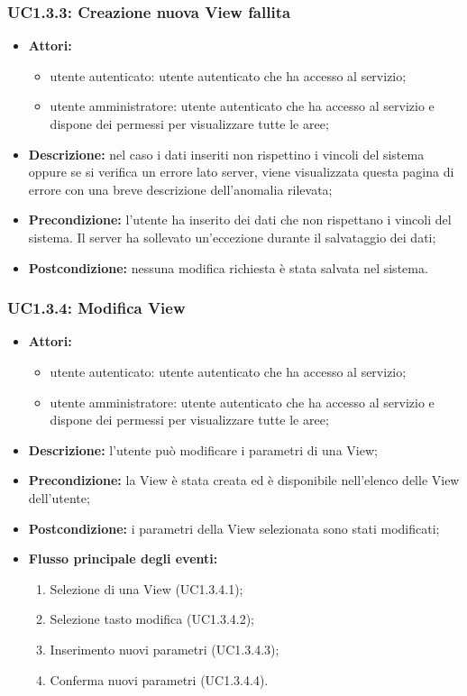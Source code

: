 \subsubsection{UC1.3.3: Creazione nuova View fallita}

\begin{itemize}
   	\item \textbf{Attori:}
    \begin{itemize}
    	\item utente autenticato: utente autenticato che ha accesso al servizio;
    	\item utente amministratore: utente autenticato che ha accesso al servizio e dispone dei permessi per visualizzare tutte le aree;
	\end{itemize}
    \item \textbf{Descrizione:} nel caso i dati inseriti non rispettino i vincoli del sistema oppure se si verifica un errore lato server, viene visualizzata questa pagina di errore con una breve descrizione dell'anomalia rilevata;
    \item \textbf{Precondizione:} l'utente ha inserito dei dati che non rispettano i vincoli del sistema. Il server ha sollevato un'eccezione durante il salvataggio dei dati;
    \item \textbf{Postcondizione:} nessuna modifica richiesta è stata salvata nel sistema.
\end{itemize}

\subsubsection{UC1.3.4: Modifica View}

\begin{itemize}
   	\item \textbf{Attori:}
    \begin{itemize}
    	\item utente autenticato: utente autenticato che ha accesso al servizio;
    	\item utente amministratore: utente autenticato che ha accesso al servizio e dispone dei permessi per visualizzare tutte le aree;
	\end{itemize}
    \item \textbf{Descrizione:} l'utente può modificare i parametri di una View;
    \item \textbf{Precondizione:} la View è stata creata ed è disponibile nell'elenco delle View dell'utente;
    \item \textbf{Postcondizione:} i parametri della View selezionata sono stati modificati;
	\item \textbf{Flusso principale degli eventi:}
    \begin{enumerate}
        \item Selezione di una View (UC1.3.4.1);
        \item Selezione tasto modifica (UC1.3.4.2);
        \item Inserimento nuovi parametri (UC1.3.4.3);
        \item Conferma nuovi parametri (UC1.3.4.4).
    \end{enumerate}
\end{itemize}

